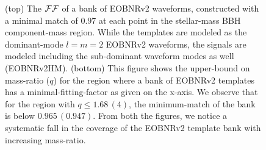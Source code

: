 \begin{figure}
\caption{\label{fig:match_eob22eobhm_m1m2} (top) The $\mathcal{FF}$ of a
bank of EOBNRv2 waveforms, constructed with a minimal match of 0.97 at each
point in the stellar-mass BBH component-mass region. While the templates are
modeled as the dominant-mode $l=m=2$ EOBNRv2 waveforms, the signals are modeled 
including the sub-dominant waveform modes as well (EOBNRv2HM). (bottom) This figure shows the 
upper-bound on mass-ratio ($q$) for the region where a bank of EOBNRv2
templates has a minimal-fitting-factor as given on the x-axis. We observe that for
the region with $q \leq 1.68\,(4)$, the minimum-match of the bank is below $0.965\,(0.947)$. 
From both the figures, we notice a systematic fall in the coverage of the EOBNRv2 
template bank with increasing mass-ratio.} 
\end{figure}
